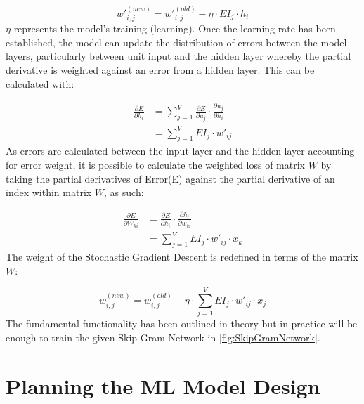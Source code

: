 \begin{equation}
    w'^{(new)}_{i,j} = w'^{(old)}_{i,j} - \eta \cdot EI_{j} \cdot h_{i}
\end{equation}
$\eta$ represents the model's training (learning). Once the learning rate has been established, the model can update the distribution of errors between the model layers, particularly between unit input and the hidden layer whereby the partial derivative is weighted against an error from a hidden layer. This can be calculated with:

\begin{equation}
    \begin{split}
        \frac{\partial E}{\partial h_{i}} & = \sum_{j=1}^{V} \frac{\partial E}{\partial u_{j}} \cdot \frac{\partial u_{j}}{\partial h_{i}} \\
                                          & = \sum_{j=1}^{V} EI_{j} \cdot w'_{ij}
    \end{split}
\end{equation}
As errors are calculated between the input layer and the hidden layer accounting for error weight, it is possible to calculate the weighted loss of matrix $W$ by taking the partial derivatives of Error(E) against the partial derivative of an index within matrix $W$, as such:

\begin{equation} \label{}
    \begin{split}
        \frac{\partial E}{\partial W_{ki}} & = \frac{\partial E}{\partial h_{i}} \cdot \frac{\partial h_{i}}{\partial w_{ki}} \\
                                           & = \sum_{j=1}^{V} EI_{j} \cdot w'_{ij} \cdot x_{k}
    \end{split}
\end{equation}
The weight of the Stochastic Gradient Descent is redefined in terms of the matrix $W$:


\begin{equation}
    w^{(new)}_{i,j} = w^{(old)}_{i,j} - \eta \cdot \sum_{j=1}^{V} EI_{j} \cdot w'_{ij} \cdot x_{j}
\end{equation}
The fundamental functionality has been outlined in theory but in practice will be enough to train the given Skip-Gram Network in \autoref{fig:SkipGramNetwork}.

\section{Planning the ML Model Design}

